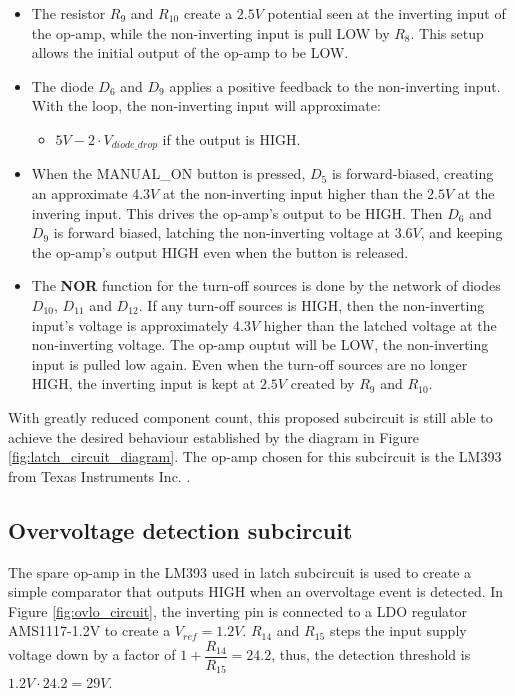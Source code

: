 \documentclass[../main.tex]{subfiles}
\begin{document}
    \begin{itemize}
        \item The resistor $R_9$ and $R_{10}$ create a $2.5V$ potential seen at the inverting input of the op-amp, while the non-inverting input is pull LOW by $R_8$. This setup allows the initial output of the op-amp to be LOW.
        \item The diode $D_6$ and $D_9$ applies a positive feedback to the non-inverting input. With the loop, the non-inverting input will approximate:
        \begin{itemize}
            \item $5V-2\cdot V_{diode\_drop}$ if the output is HIGH.
        \end{itemize}
        \item When the MANUAL\_ON button is pressed, $D_5$ is forward-biased, creating an approximate $4.3V$ at the non-inverting input higher than the $2.5V$ at the invering input. This drives the op-amp's output to be HIGH. Then $D_6$ and $D_9$ is forward biased, latching the non-inverting voltage at $3.6V$, and keeping the op-amp's output HIGH even when the button is released.
        \item The \textbf{NOR} function for the turn-off sources is done by the network of diodes $D_{10}$, $D_{11}$ and $D_{12}$. If any turn-off sources is HIGH, then the non-inverting input's voltage is approximately $4.3V$ higher than the latched voltage at the non-inverting voltage. The op-amp ouptut will be LOW, the non-inverting input is pulled low again. Even when the turn-off sources are no longer HIGH, the inverting input is kept at $2.5V$ created by $R_9$ and $R_{10}$.
    \end{itemize}

    \justify
    With greatly reduced component count, this proposed subcircuit is still able to achieve the desired behaviour established by the diagram in Figure \ref{fig:latch_circuit_diagram}. The op-amp chosen for this subcircuit is the LM393 from Texas Instruments Inc. \cite{LM393}.

    \pagebreak
    \subsection{Overvoltage detection subcircuit} \label{ssec:ovlo_circuit}
    \justify
    The spare op-amp in the LM393 used in latch subcircuit is used to create a simple comparator that outputs HIGH when an overvoltage event is detected. In Figure \ref{fig:ovlo_circuit}, the inverting pin is connected to a LDO regulator AMS1117-1.2V to create a $V_{ref}=1.2V$. $R_{14}$ and $R_{15}$ steps the input supply voltage down by a factor of $1+\dfrac{R_{14}}{R_{15}}= 24.2$, thus, the detection threshold is $1.2V\cdot 24.2=29V$.
\end{document}
